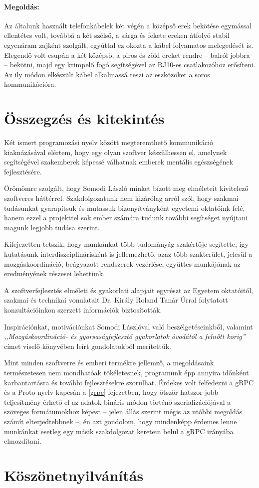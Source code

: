 \documentclass[tocnopagenum]{thesis-ekf}
\theoremstyle{definition}
\theoremstyle{remark}
\begin{document}
	\subsubsection{Megoldás:} Az általunk használt telefonkábelek két végén a középső erek bekötése egymással ellentétes volt, továbbá a két szélső, a sárga és fekete ereken átfolyó stabil egyenáram zajként szolgált, egyúttal ez okozta a kábel folyamatos melegedését is. Elegendő volt csupán a két középső, a piros és zöld ereket rendre -- balról jobbra --  bekötni, majd egy krimpelő fogó segítségével az RJ10-es csatlakozóhoz erősíteni. Az ily módon elkészült kábel alkalmassá teszi az eszközöket a soros kommunikációra.
	\chapter*{Összegzés és kitekintés}
	Két ismert programozási nyelv között megteremthető kommunikáció kiaknázásával elértem, hogy egy olyan szoftver készülhessen el, amelynek segítségével szakemberek képessé válhatnak emberek mentális egészségének fejlesztésére. 
	
	Örömömre szolgált, hogy Somodi László minket bízott meg elméleteit kivitelező szoftveres háttérrel. Szakdolgozatunk nem kizárólag arról szól, hogy szakmai tudásunkat gyarapítsuk és mutassuk bizonyítványként egyetemi oktatóink felé, hanem ezzel a projekttel sok ember számára tudunk további segítséget nyújtani magunk legjobb tudása szerint.
	
	Kifejezetten tetszik, hogy munkánkat több tudományág szakértője segítette, így kutatásunk interdiszciplinárisként is jellemezhető, azaz több szakterület, jelesül a mozgáskoordináció, beágyazott rendszerek vezérlése, együttes munkájának az eredményének részesei lehettünk.
	
	A szoftverfejlesztés elméleti és gyakorlati alapjait egyrészt az Egyetem oktatóitól, szakmai és technikai vonulatait Dr. Király Roland Tanár Úrral folytatott konzultációinkon szerzett információk biztosították. 
	
	Inspirációnkat, motivációnkat Somodi Lászlóval való beszélgetéseinkből, valamint \textit{,,Mozgáskoordináció- és gyorsaságfejlesztő gyakorlatok óvodától a felnőtt korig''} címet viselő könyvében leírt gondolatokból merítettük.
	
	Mint minden szoftverre és emberi termékre jellemző, a megoldásaink természetesen nem mondhatóak tökéletesnek, programunk épp annyira időnként karbantartásra és további fejlesztésekre szorulhat. Érdekes volt felfedezni a gRPC és a Proto-nyelv kapcsán a \ref{grpc} fejezetben, hogy ötször-hatszor jobb teljesítmény érhető el az adatok bináris módon történő szerializációjával a szöveges formátumokhoz képest -- jelen állás szerint mégis az utóbbi megoldás számít elterjedtebbnek --, én azt gondolom, hogy mindenképp érdemes lenne munkánkat esetleg egy másik szakdolgozat keretein belül a gRPC irányába elmozdítani.
	\chapter*{Köszönetnyilvánítás}
	
	
	\listoffigures
\end{document}
